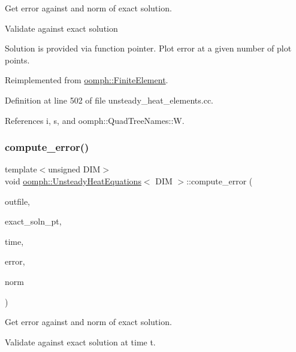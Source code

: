 Get error against and norm of exact solution. 

Validate against exact solution

Solution is provided via function pointer. Plot error at a given number of plot points. 

Reimplemented from \hyperlink{classoomph_1_1FiniteElement_a73c79a1f1e5b1d334757812a6bbd58ff}{oomph\+::\+Finite\+Element}.



Definition at line 502 of file unsteady\+\_\+heat\+\_\+elements.\+cc.



References i, s, and oomph\+::\+Quad\+Tree\+Names\+::W.

\mbox{\label{classoomph_1_1UnsteadyHeatEquations_ab6d9162fbdc253de4cc7064e3c1459aa}} 
\subsubsection{\texorpdfstring{compute\+\_\+error()}{compute\_error()}\hspace{0.1cm}{\footnotesize\ttfamily [2/2]}}
{\footnotesize\ttfamily template$<$unsigned D\+IM$>$ \\
void \hyperlink{classoomph_1_1UnsteadyHeatEquations}{oomph\+::\+Unsteady\+Heat\+Equations}$<$ D\+IM $>$\+::compute\+\_\+error (\begin{DoxyParamCaption}\item[{std\+::ostream \&}]{outfile,  }\item[{\hyperlink{classoomph_1_1FiniteElement_ad4ecf2b61b158a4b4d351a60d23c633e}{Finite\+Element\+::\+Unsteady\+Exact\+Solution\+Fct\+Pt}}]{exact\+\_\+soln\+\_\+pt,  }\item[{const double \&}]{time,  }\item[{double \&}]{error,  }\item[{double \&}]{norm }\end{DoxyParamCaption})\hspace{0.3cm}{\ttfamily [virtual]}}



Get error against and norm of exact solution. 

Validate against exact solution at time t.

